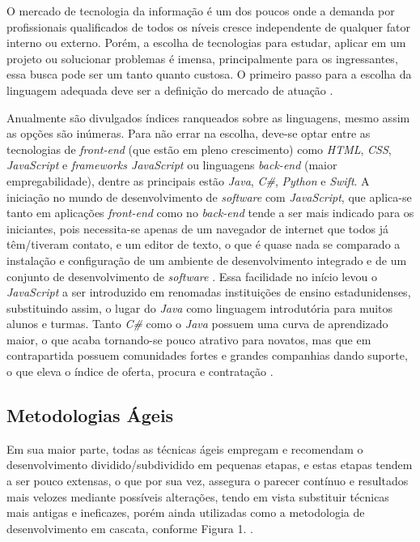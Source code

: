 O mercado de tecnologia da informação é um dos poucos onde a demanda por profissionais qualificados de todos os níveis cresce independente de qualquer fator interno ou externo. Porém, a escolha de tecnologias para estudar, aplicar em um projeto ou solucionar problemas é imensa, principalmente para os ingressantes, essa busca pode ser um tanto quanto custosa. O primeiro passo para a escolha da linguagem adequada deve ser a definição do mercado de atuação \cite{Scudero2017}.

Anualmente são divulgados índices ranqueados sobre as linguagens, mesmo assim as opções são inúmeras. 
Para não errar na escolha, deve-se optar entre as tecnologias de \textit{front-end} (que estão em pleno crescimento) como \textit{HTML}, \textit{CSS}, \textit{JavaScript} e \textit{frameworks JavaScript} ou linguagens \textit{back-end} (maior empregabilidade), dentre as principais estão \textit{Java}, \textit{C\#}, \textit{Python} e \textit{Swift}.
A iniciação no mundo de desenvolvimento de \textit{software} com \textit{JavaScript}, que aplica-se tanto em aplicações \textit{front-end} como no \textit{back-end} tende a ser mais indicado para os iniciantes, pois necessita-se apenas de um navegador de internet que todos já têm/tiveram contato, e um editor de texto, o que é quase nada se comparado a instalação e configuração de um ambiente de desenvolvimento integrado e de um conjunto de desenvolvimento de \textit{software} \cite{Scudero2017}. Essa facilidade no início levou o \textit{JavaScript} a ser introduzido em renomadas instituições de ensino estadunidenses, substituindo assim, o lugar do \textit{Java} como linguagem introdutória para muitos alunos e turmas. Tanto \textit{C\#} como o \textit{Java} possuem uma curva de aprendizado maior, o que acaba tornando-se pouco atrativo para novatos, mas que em contrapartida possuem comunidades fortes e grandes companhias dando suporte, o que eleva o índice de oferta, procura e contratação \cite{Scudero2017}. 

\subsection{Metodologias Ágeis}
Em sua maior parte, todas as técnicas ágeis empregam e recomendam o desenvolvimento dividido/subdividido em pequenas etapas, e estas etapas tendem a ser pouco extensas, o que por sua vez, assegura o parecer contínuo e resultados mais velozes mediante possíveis alterações, tendo em vista substituir técnicas mais antigas e ineficazes, porém ainda utilizadas como a metodologia de desenvolvimento em cascata, conforme Figura 1. \cite{gomes2014agile}.

